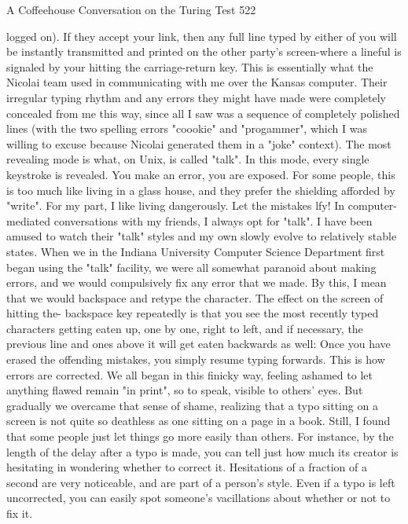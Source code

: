 A Coffeehouse Conversation on the Turing Test                                         522

logged on). If they accept your link, then any full line typed by either of you will be
instantly transmitted and printed on the other party's screen-where a lineful is signaled
by your hitting the carriage-return key. This is essentially what the Nicolai team used
in communicating with me over the Kansas computer. Their irregular typing rhythm
and any errors they might have made were completely concealed from me this way,
since all I saw was a sequence of completely polished lines (with the two spelling
errors "coookie" and "progammer", which I was willing to excuse because Nicolai
generated them in a "joke" context).
    The most revealing mode is what, on Unix, is called "talk". In this mode, every
single keystroke is revealed. You make an error, you are exposed. For some people,
this is too much like living in a glass house, and they prefer the shielding afforded by
"write". For my part, I like living dangerously. Let the mistakes lfy! In computer-
mediated conversations with my friends, I always opt for "talk". I have been amused
to watch their "talk" styles and my own slowly evolve to relatively stable states.
    When we in the Indiana University Computer Science Department first began
using the "talk" facility, we were all somewhat paranoid about making errors, and we
would compulsively fix any error that we made. By this, I mean that we would
backspace and retype the character. The effect on the screen of hitting the- backspace
key repeatedly is that you see the most recently typed characters getting eaten up, one
by one, right to left, and if necessary, the previous line and ones above it will get
eaten backwards as well: Once you have erased the offending mistakes, you simply
resume typing forwards. This is how errors are corrected. We all began in this finicky
way, feeling ashamed to let anything flawed remain "in print", so to speak, visible to
others' eyes. But gradually we overcame that sense of shame, realizing that a typo
sitting on a screen is not quite so deathless as one sitting on a page in a book.
    Still, I found that some people just let things go more easily than others. For
instance, by the length of the delay after a typo is made, you can tell just how much its
creator is hesitating in wondering whether to correct it. Hesitations of a fraction of a
second are very noticeable, and are part of a person's style. Even if a typo is left
uncorrected, you can easily spot someone's vacillations about whether or not to fix it.
